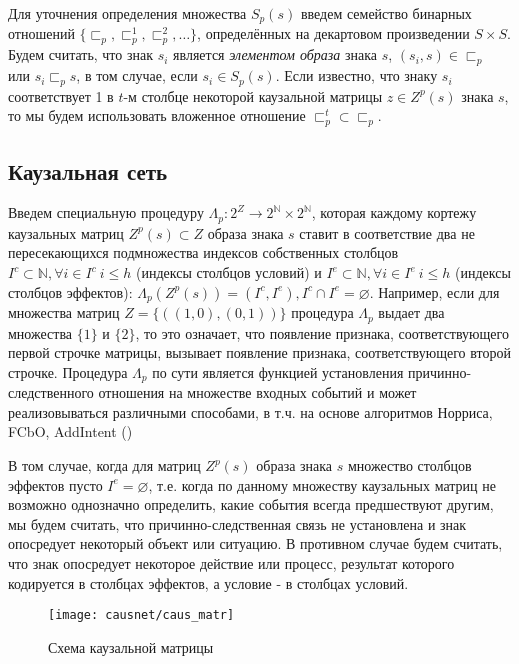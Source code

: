 \documentclass[12pt]{scrartcl}
\begin{document}
	Для уточнения определения множества $S_p(s)$ введем семейство бинарных отношений $\{\sqsubset_p,\sqsubset_p^1,\sqsubset_p^2,\dots\}$, определённых на декартовом произведении $S\times S$. Будем считать, что знак $s_i$ является \textit{элементом образа} знака $s$, $(s_i,s)\in\sqsubset_p$ или $s_i\sqsubset_p s$, в том случае, если $s_i\in S_p(s)$. Если известно, что знаку $s_i$ соответствует 1 в $t$-м столбце некоторой каузальной матрицы $z\in Z^p(s)$ знака $s$, то мы будем использовать вложенное отношение $\sqsubset_p^t\subset \sqsubset_p$.

	\subsection{Каузальная сеть} \label{subsec:causal_net}
	
	Введем специальную процедуру $\Lambda_p: 2^Z\rightarrow 2^{\mathbb N}\times 2^{\mathbb N}$, которая каждому кортежу каузальных матриц $Z^p(s)\subset Z$ образа знака $s$ ставит в соответствие два не пересекающихся подмножества индексов собственных столбцов $I^c\subset\mathbb N, \forall i\in I^c\ i\leq h$ (индексы столбцов условий) и $I^e\subset\mathbb N, \forall i\in I^e\ i\leq h$ (индексы столбцов эффектов): $\Lambda_p(Z^p(s))=(I^c,I^e), I^c\cap I^e=\varnothing$. Например, если для множества матриц $Z=\{((1, 0), (0, 1))\}$ процедура $\Lambda_p$ выдает два множества $\{1\}$ и $\{2\}$, то это означает, что появление признака, соответствующего первой строчке матрицы, вызывает появление признака, соответствующего второй строчке. Процедура $\Lambda_p$ по сути является функцией установления причинно-следственного отношения на множестве входных событий и может реализовываться различными способами, в т.ч. на основе алгоритмов Норриса, FCbO, AddIntent (\cite{Norris1978,Krajca2010,Merwe2004})

	В том случае, когда для матриц $Z^p(s)$ образа знака $s$ множество столбцов эффектов пусто $I^e=\varnothing$, т.е. когда по данному множеству каузальных матриц не возможно однозначно определить, какие события всегда предшествуют другим, мы будем считать, что причинно-следственная связь не установлена и знак опосредует некоторый объект или ситуацию. В противном случае будем считать, что знак опосредует некоторое действие или процесс, результат которого кодируется в столбцах эффектов, а условие - в столбцах условий. 

	\begin{figure}
		\centering
		\texttt{[image: causnet/caus\_matr]}
		\caption{Схема каузальной матрицы}	
		\label{fig:caus_matr}	
	\end{figure}
	
\end{document}
